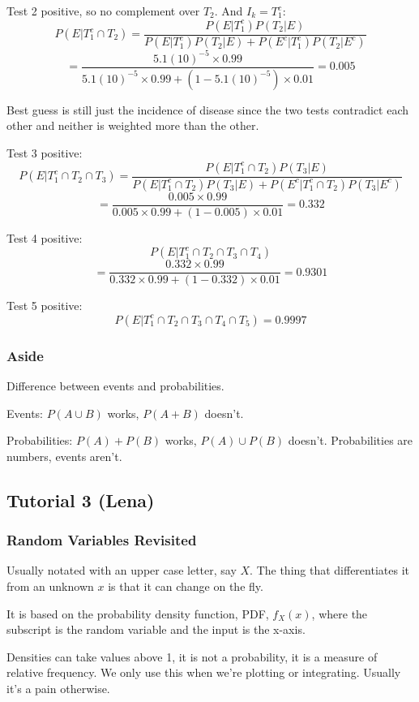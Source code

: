 \documentclass{article}
\begin{document}
\begin{enumerate}[(a)]
Test 2 positive, so no complement over $T_2$. And $I_k = T_1^c$: $$ P(E|T_1^c \cap T_2) =\frac{P(E|T_1^c) P(T_2|E)}{P(E|T_1^c) P(T_2|E) + P(E^c|T_1^c) P(T_2|E^c)}$$ $$= \frac{5.1(10)^{-5} \times 0.99}{5.1(10)^{-5} \times 0.99 + (1-5.1(10)^{-5}) \times 0.01} = 0.005$$

Best guess is still just the incidence of disease since the two tests contradict each other and neither is weighted more than the other.

Test 3 positive: $$P(E|T_1^c \cap T_2 \cap T_3) =\frac{P(E|T_1^c \cap T_2) P(T_3|E)}{P(E|T_1^c \cap T_2) P(T_3|E) + P(E^c|T_1^c \cap T_2) P(T_3|E^c)} $$ $$ = \frac{0.005 \times 0.99}{0.005 \times 0.99 + (1-0.005) \times 0.01} = 0.332 $$

Test 4 positive: $$P(E|T_1^c \cap T_2 \cap T_3 \cap T_4) $$ $$= \frac{0.332 \times 0.99}{0.332 \times 0.99 + (1-0.332) \times 0.01} = 0.9301 $$

Test 5 positive: $$P(E|T_1^c \cap T_2 \cap T_3 \cap T_4 \cap T_5) = 0.9997 $$

\subsubsection*{Aside}

Difference between events and probabilities.

Events: $P(A \cup B)$ works, $P(A+B)$ doesn't.

Probabilities: $P(A) + P(B)$ works, $P(A) \cup P(B)$ doesn't. Probabilities are numbers, events aren't.

\end{enumerate}

\subsection{Tutorial 3 (Lena)}

\subsubsection{Random Variables Revisited}

Usually notated with an upper case letter, say $X$.  The thing that differentiates it from an unknown $x$ is that it can change on the fly.

It is based on the probability density function, PDF, $f_X(x)$, where the subscript is the random variable and the input is the x-axis.

Densities can take values above 1, it is not a probability, it is a measure of relative frequency. We only use this when we're plotting or integrating. Usually it's a pain otherwise.
\end{document}
